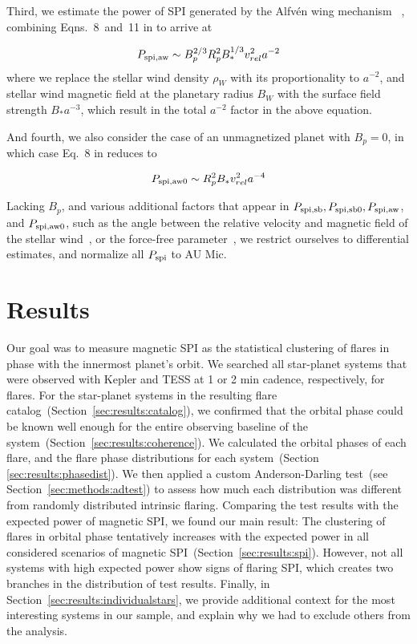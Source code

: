 \documentclass[twocolumn]{aastex631}
\begin{document}
Third, we estimate the power of SPI generated by the Alfv\'en wing mechanism ~\citep{saur2013magnetic,kavanagh2022radio}, combining Eqns.~8~and~11 in \citet{kavanagh2022radio} to arrive at

\begin{equation}
    P_{\rm spi,aw} \sim B_p^{2/3} R_{p}^2    B_*^{1/3}  v_{rel}^2 a^{-2}  
\end{equation}
where we replace the stellar wind density $\rho_W$ with its proportionality to $a^{-2}$, and stellar wind magnetic field at the planetary radius $B_W$ with the surface field strength $B_* a^{-3}$, which result in the total $a^{-2}$ factor in the above equation.

And fourth, we also consider the case of an unmagnetized planet with $B_p=0$, in which case Eq.~8 in \cite{kavanagh2022radio} reduces to

\begin{equation}
    P_{\rm spi,aw0} \sim R_p^2  B_*  v_{rel}^2  a^{-4}
\end{equation}

Lacking $B_p$, and various additional factors that appear in $P_{\rm spi,sb},P_{\rm spi,sb0},P_{\rm spi,aw}$, and  $P_{\rm spi,aw0}$, such as the angle between the relative velocity and magnetic field of the stellar wind~\citep{kavanagh2022radio}, or the force-free parameter~\citep{lanza2012starplanet}, we restrict ourselves to differential estimates, and normalize all $P_{\rm spi}$ to AU Mic.

\section{Results}
\label{sec:results}

Our goal was to measure magnetic SPI as the statistical clustering of flares in phase with the innermost planet's orbit. We searched all star-planet systems that were observed with Kepler and TESS at 1 or 2 min cadence, respectively, for flares. For the star-planet systems in the resulting flare catalog~(Section~\ref{sec:results:catalog}), we confirmed that the orbital phase could be known well enough for the entire observing baseline of the system~(Section~\ref{sec:results:coherence}). We calculated the orbital phases of each flare, and the flare phase distributions for each system~(Section \ref{sec:results:phasedist}). We then applied a custom Anderson-Darling test~(see Section~\ref{sec:methods:adtest}) to assess how much each distribution was different from randomly distributed intrinsic flaring. Comparing the test results with the expected power of magnetic SPI, we found our main result: The clustering of flares in orbital phase tentatively increases with the expected power in all considered scenarios of magnetic SPI~(Section~\ref{sec:results:spi}). However, not all systems with high expected power show signs of flaring SPI, which creates two branches in the distribution of test results. Finally, in Section~\ref{sec:results:individualstars}, we provide additional context for the most interesting systems in our sample, and explain why we had to exclude others from the analysis.
\end{document}
